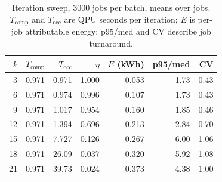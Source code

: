\begin{table}[t]
\caption{Iteration sweep, 3000 jobs per batch, means over jobs.
$T_{\mathrm{comp}}$ and $T_{\mathrm{occ}}$ are QPU seconds per iteration;
$E$ is per-job attributable energy; p95/med and CV describe job turnaround.}
\label{tab:sweep}
\centering
\begin{tabular}{@{}rrrrrrr@{}}
\toprule
$k$ & $T_{\mathrm{comp}}$ & $T_{\mathrm{occ}}$ & $\eta$ & $E$ (kWh) & p95/med & CV \\
\midrule
 3 & 0.971 &  0.971 & 1.000 & 0.053 & 1.73 & 0.43 \\
 6 & 0.971 &  0.974 & 0.996 & 0.107 & 1.73 & 0.43 \\
 9 & 0.971 &  1.017 & 0.954 & 0.160 & 1.85 & 0.46 \\
12 & 0.971 &  1.394 & 0.696 & 0.213 & 2.84 & 0.70 \\
15 & 0.971 &  7.727 & 0.126 & 0.267 & 6.00 & 1.06 \\
18 & 0.971 & 26.09  & 0.037 & 0.320 & 5.92 & 1.08 \\
21 & 0.971 & 39.73  & 0.024 & 0.373 & 4.38 & 1.00 \\
\bottomrule
\end{tabular}
\end{table}
